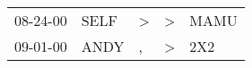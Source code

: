 \begin{supertabular}{lllll}
 08-24-00 &  SELF &  \textgreater &  \textgreater &  MAMU \\
 09-01-00 &  ANDY &             , &  \textgreater &   2X2 \\
\end{supertabular}
